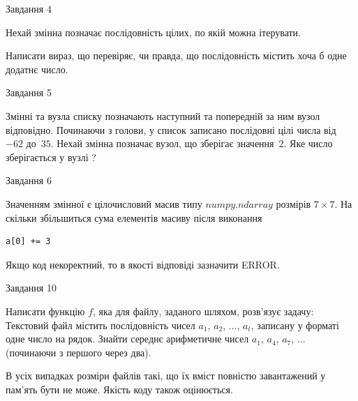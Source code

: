 \documentclass[12pt, ukrainian]{article}
\begin{document}
{\begin{minipage}[t]{8.0cm}
\end{minipage}


               
{\begin{center}Завдання {4}\end{center}}
\vspace{-4mm}
Нехай змінна  позначає послідовність цілих, по якій можна ітерувати.

Написати вираз, що перевіряє, чи правда, що послідовність  містить хоча б одне додатнє число.\par

\vspace{10mm}
               
{\begin{center}Завдання {5}\end{center}}
\vspace{-4mm}
Змінні  та  вузла списку позначають наступний та попередній за ним вузол відповідно. Починаючи з голови, у список записано послідовні цілі числа від~$-62$ до~$35$. Нехай змінна  позначає вузол, що зберігає значення~$2$.
Яке число зберігається у вузлі  ?\par

               
{\begin{center}Завдання {6}\end{center}}
\vspace{-4mm}
Значенням змінної  є цілочисловий масив типу $numpy.ndarray$ розмірів $7{\times}7$. На скільки збільшиться сума елементів масиву  після виконання
\begin{verbatim}
a[0] += 3
\end{verbatim}


Якщо код некоректний, то в якості відповіді зазначити ERROR.\par

               
{\begin{center}Завдання {10}\end{center}}
\vspace{-4mm}

Написати функцію $f$, яка для файлу, заданого шляхом, розв’язує задачу:\\ Текстовий файл містить послідовність чисел $a_1$, $a_2$, $\ldots$, $a_t$, записану у форматі одне число на рядок. Знайти середнє арифметичне чисел $a_1$, $a_4$, $a_7$, $\ldots$ (починаючи з першого через два).

В усіх випадках розміри файлів такі, що їх вміст повністю завантажений у пам'ять бути не може. Якість коду також оцінюється.



}
\end{document}

